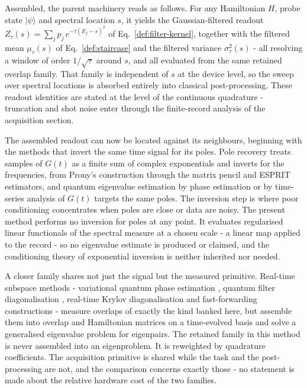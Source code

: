Assembled, the parent machinery reads as follows. For any Hamiltonian $H$, probe state $|\psi\rangle$ and spectral location $s$, it yields the Gaussian-filtered readout $Z_\tau(s) = \sum_j p_j\, e^{-\tau (E_j - s)^2}$ of Eq.~\eqref{def:filter-kernel}, together with the filtered mean $\mu_\tau(s)$ of Eq.~\eqref{def:staircase} and the filtered variance $\sigma_\tau^2(s)$ - all resolving a window of order $1/\sqrt{\tau}$ around $s$, and all evaluated from the same retained overlap family. That family is independent of $s$ at the device level, so the sweep over spectral locations is absorbed entirely into classical post-processing. These readout identities are stated at the level of the continuous quadrature - truncation and shot noise enter through the finite-record analysis of the acquisition section.

The assembled readout can now be located against its neighbours, beginning with the methods that invert the same time signal for its poles. Pole recovery treats samples of $G(t)$ as a finite sum of complex exponentials and inverts for the frequencies, from Prony's construction \cite{prony1795essai} through the matrix pencil \cite{hua1990pencil} and ESPRIT \cite{roy1989esprit} estimators, and quantum eigenvalue estimation by phase estimation \cite{obrien2019qpe} or by time-series analysis of $G(t)$ \cite{somma2019eigenvalue} targets the same poles. The inversion step is where poor conditioning concentrates when poles are close or data are noisy. The present method performs no inversion for poles at any point. It evaluates regularised linear functionals of the spectral measure at a chosen scale - a linear map applied to the record - so no eigenvalue estimate is produced or claimed, and the conditioning theory of exponential inversion is neither inherited nor needed.

A closer family shares not just the signal but the measured primitive. Real-time subspace methods - variational quantum phase estimation \cite{klymko2022vqpe}, quantum filter diagonalisation \cite{parrish2019qfd}, real-time Krylov diagonalisation \cite{shen2023realtimekrylov} and fast-forwarding constructions \cite{cortes2022fastforward} - measure overlaps of exactly the kind banked here, but assemble them into overlap and Hamiltonian matrices on a time-evolved basis and solve a generalised eigenvalue problem for eigenpairs. The retained family in this method is never assembled into an eigenproblem. It is reweighted by quadrature coefficients. The acquisition primitive is shared while the task and the post-processing are not, and the comparison concerns exactly those - no statement is made about the relative hardware cost of the two families.

